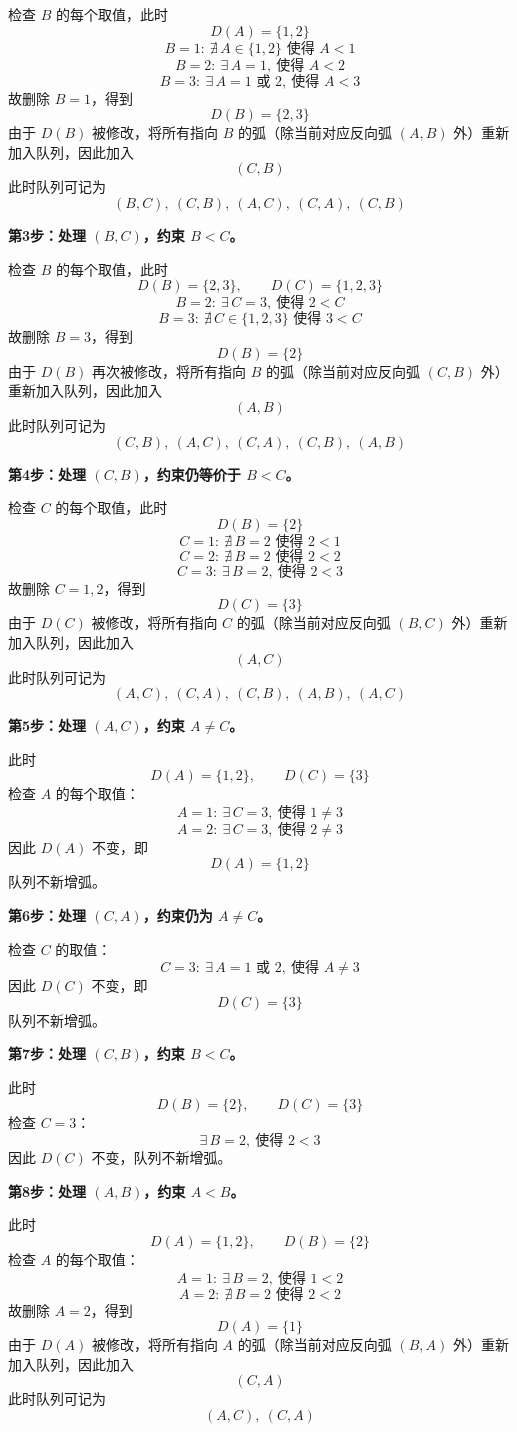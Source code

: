 \documentclass[../main.tex]{subfiles}
\begin{document}
\begin{enumerate}
{检查 $B$ 的每个取值，此时
$$
D(A)=\{1,2\}
$$
$$
B=1:\ \nexists\,A\in\{1,2\}\text{ 使得 }A<1
$$
$$
B=2:\ \exists\,A=1,\ \text{使得 }A<2
$$
$$
B=3:\ \exists\,A=1\text{ 或 }2,\ \text{使得 }A<3
$$
故删除 $B=1$，得到
$$
D(B)=\{2,3\}
$$
由于 $D(B)$ 被修改，将所有指向 $B$ 的弧（除当前对应反向弧 $(A,B)$ 外）重新加入队列，因此加入
$$
(C,B)
$$
此时队列可记为
$$
(B,C),\ (C,B),\ (A,C),\ (C,A),\ (C,B)
$$

\textbf{第3步：处理 $(B,C)$，约束 $B<C$。}

检查 $B$ 的每个取值，此时
$$
D(B)=\{2,3\},\qquad D(C)=\{1,2,3\}
$$
$$
B=2:\ \exists\,C=3,\ \text{使得 }2<C
$$
$$
B=3:\ \nexists\,C\in\{1,2,3\}\text{ 使得 }3<C
$$
故删除 $B=3$，得到
$$
D(B)=\{2\}
$$
由于 $D(B)$ 再次被修改，将所有指向 $B$ 的弧（除当前对应反向弧 $(C,B)$ 外）重新加入队列，因此加入
$$
(A,B)
$$
此时队列可记为
$$
(C,B),\ (A,C),\ (C,A),\ (C,B),\ (A,B)
$$

\textbf{第4步：处理 $(C,B)$，约束仍等价于 $B<C$。}

检查 $C$ 的每个取值，此时
$$
D(B)=\{2\}
$$
$$
C=1:\ \nexists\,B=2\text{ 使得 }2<1
$$
$$
C=2:\ \nexists\,B=2\text{ 使得 }2<2
$$
$$
C=3:\ \exists\,B=2,\ \text{使得 }2<3
$$
故删除 $C=1,2$，得到
$$
D(C)=\{3\}
$$
由于 $D(C)$ 被修改，将所有指向 $C$ 的弧（除当前对应反向弧 $(B,C)$ 外）重新加入队列，因此加入
$$
(A,C)
$$
此时队列可记为
$$
(A,C),\ (C,A),\ (C,B),\ (A,B),\ (A,C)
$$

\textbf{第5步：处理 $(A,C)$，约束 $A\neq C$。}

此时
$$
D(A)=\{1,2\},\qquad D(C)=\{3\}
$$
检查 $A$ 的每个取值：
$$
A=1:\ \exists\,C=3,\ \text{使得 }1\neq 3
$$
$$
A=2:\ \exists\,C=3,\ \text{使得 }2\neq 3
$$
因此 $D(A)$ 不变，即
$$
D(A)=\{1,2\}
$$
队列不新增弧。

\textbf{第6步：处理 $(C,A)$，约束仍为 $A\neq C$。}

检查 $C$ 的取值：
$$
C=3:\ \exists\,A=1\text{ 或 }2,\ \text{使得 }A\neq 3
$$
因此 $D(C)$ 不变，即
$$
D(C)=\{3\}
$$
队列不新增弧。

\textbf{第7步：处理 $(C,B)$，约束 $B<C$。}

此时
$$
D(B)=\{2\},\qquad D(C)=\{3\}
$$
检查 $C=3$：
$$
\exists\,B=2,\ \text{使得 }2<3
$$
因此 $D(C)$ 不变，队列不新增弧。

\textbf{第8步：处理 $(A,B)$，约束 $A<B$。}

此时
$$
D(A)=\{1,2\},\qquad D(B)=\{2\}
$$
检查 $A$ 的每个取值：
$$
A=1:\ \exists\,B=2,\ \text{使得 }1<2
$$
$$
A=2:\ \nexists\,B=2\text{ 使得 }2<2
$$
故删除 $A=2$，得到
$$
D(A)=\{1\}
$$
由于 $D(A)$ 被修改，将所有指向 $A$ 的弧（除当前对应反向弧 $(B,A)$ 外）重新加入队列，因此加入
$$
(C,A)
$$
此时队列可记为
$$
(A,C),\ (C,A)
$$

}
\end{enumerate}
\end{document}
